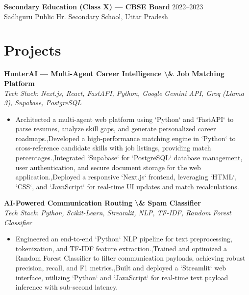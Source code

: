 \documentclass[11pt,a4paper]{article}
\begin{document}
\textbf{Secondary Education (Class X) — CBSE Board} \hfill 2022–2023\\
Sadhguru Public Hr. Secondary School, Uttar Pradesh\\

\vspace{0.1cm}



\section*{Projects}

\textbf{HunterAI — Multi-Agent Career Intelligence \textbackslash{}& Job Matching Platform}\\
\textit{Tech Stack: Next.js, React, FastAPI, Python, Google Gemini API, Groq (Llama 3), Supabase, PostgreSQL}\\
\begin{itemize}
    \item Architected a multi-agent web platform using `Python` and `FastAPI` to parse resumes, analyze skill gaps, and generate personalized career roadmaps.,Developed a high-performance matching engine in `Python` to cross-reference candidate skills with job listings, providing match percentages.,Integrated `Supabase` for `PostgreSQL` database management, user authentication, and secure document storage for the web application.,Deployed a responsive `Next.js` frontend, leveraging `HTML`, `CSS`, and `JavaScript` for real-time UI updates and match recalculations.
\end{itemize}

\vspace{0.15cm}

\textbf{AI-Powered Communication Routing \textbackslash{}& Spam Classifier}\\
\textit{Tech Stack: Python, Scikit-Learn, Streamlit, NLP, TF-IDF, Random Forest Classifier}\\
\begin{itemize}
    \item Engineered an end-to-end `Python` NLP pipeline for text preprocessing, tokenization, and TF-IDF feature extraction.,Trained and optimized a Random Forest Classifier to filter communication payloads, achieving robust precision, recall, and F1 metrics.,Built and deployed a `Streamlit` web interface, utilizing `Python` and `JavaScript` for real-time text payload inference with sub-second latency.
\end{itemize}
\end{document}

